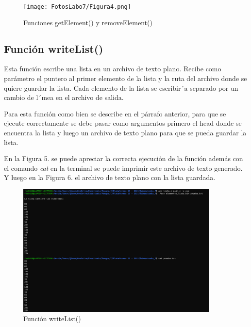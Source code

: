 \documentclass[12pt,a4paper]{article}
\begin{document}
\begin{figure}[H]
    \centering
    \center
    \texttt{[image: FotosLabo7/Figura4.png]}
    \caption{Funciones getElement() y removeElement() \cite{cap}}
    \label{fig:push_front}
\end{figure}

\subsection{Función writeList()}

Esta función escribe una lista en un archivo de texto plano. Recibe como parámetro el puntero al primer elemento de la lista y la ruta del archivo donde se quiere guardar la lista. Cada elemento de la lista se escribir´a separado por un cambio de l´ınea en el archivo de salida.

Para esta función como bien se describe en el párrafo anterior, para que se ejecute correctamente se debe pasar como argumentos primero el head donde se encuentra la lista y luego un archivo de texto plano para que se pueda guardar la lista.

En la Figura 5. se puede apreciar la correcta ejecución de la función además con el comando \textit{cat} en la terminal se puede imprimir este archivo de texto generado. Y luego en la Figura 6. el archivo de texto plano con la lista guardada.

\begin{figure}[H]
    \centering
    \center
    \includegraphics[width=0.9\textwidth]{FotosLabo7/Figura 5.png}
    \caption{Función writeList() \cite{cap}}
    \label{fig:push_front}
\end{figure}
\end{document}
